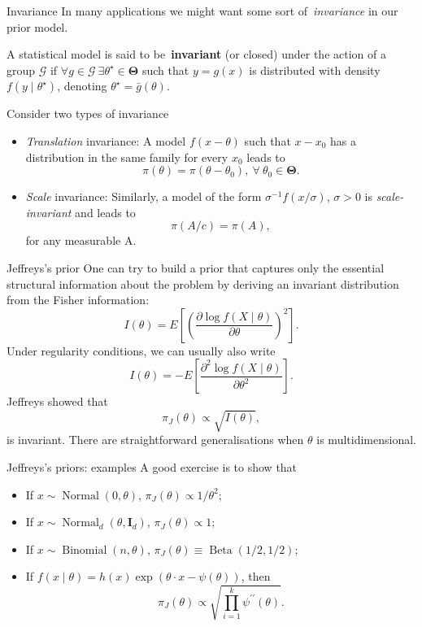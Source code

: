 \begin{frame}{Invariance}
In many applications we might want some sort of~\textit{invariance} in our prior model. 
\begin{defn}
 \label{def:invariant_model}
 A statistical model is said to be~\textbf{invariant} (or closed) under the action of a group $\mathcal{G}$ if $\forall g \in \mathcal{G} \: \exists \theta^\star \in \boldsymbol{\Theta}$ such that $y = g(x)$ is distributed with density $f(y\mid \theta^\star)$, denoting $\theta^\star = \bar{g}(\theta)$.
\end{defn}
Consider two types of invariance
\begin{itemize}
 \item \textit{Translation} invariance:
 A model $f(x-\theta)$ such that $x-x_0$ has a distribution in the same family for every $x_0$ leads to
 $$\pi(\theta) = \pi(\theta-\theta_0),\: \forall\: \theta_0 \in \boldsymbol{\Theta}.$$
 \item \textit{Scale} invariance:
 Similarly, a model of the form $\sigma^{-1} f(x/\sigma)$, $\sigma >0$ is \textit{scale-invariant} and  leads to
 $$ \pi(A/c) = \pi(A),$$
 for any measurable A.
\end{itemize}
\end{frame}
\begin{frame}{Jeffreys's prior}
One can try to build a prior that captures only the essential structural information about the problem by deriving an invariant distribution from the Fisher information:
$$ I(\theta) = E\left[\left(\frac{\partial \log f(X \mid \theta)}{\partial \theta}\right)^2\right].$$
Under regularity conditions, we can usually also write
$$ I(\theta) = - E\left[\frac{\partial^2 \log f(X \mid \theta)}{\partial \theta^2}\right].$$
Jeffreys showed that 
$$\pi_J(\theta) \propto \sqrt{I(\theta)},$$
is invariant.
There are straightforward generalisations when $\theta$ is multidimensional.
\end{frame}
\begin{frame}{Jeffreys's priors: examples}
A good exercise is to show that
\begin{itemize}
 \item If $x \sim \operatorname{Normal}(0, \theta)$, $\pi_J(\theta) \propto 1/\theta^2$;
 \item If $x \sim \operatorname{Normal}_d(\theta, \boldsymbol{I}_d)$, $\pi_J(\theta) \propto 1$;
 \item If $x \sim \operatorname{Binomial}(n, \theta)$, $\pi_J(\theta) \equiv \operatorname{Beta}(1/2, 1/2)$;
 \item If $f(x\mid \theta) = h(x) \exp\left(\theta \cdot x - \psi(\theta)\right)$, then
 $$ \pi_J(\theta)  \propto \sqrt{\prod_{i=1}^k\psi^{\prime\prime}(\theta)}.$$
\end{itemize}
\end{frame}
